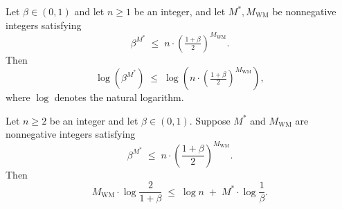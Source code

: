 \begin{theorem}
\label{wm_combined_potential_bound}
\leanok
{}
Let $\beta \in (0,1)$ and let $n \ge 1$ be an integer, and let $M^\ast, M_{\mathrm{WM}}$
be nonnegative integers satisfying
\[
  \beta^{M^\ast} \;\le\; n \cdot \left(\tfrac{1+\beta}{2}\right)^{M_{\mathrm{WM}}}.
\]
Then
\[
  \log\!\left(\beta^{M^\ast}\right)
  \;\le\;
  \log\!\left(n \cdot \left(\tfrac{1+\beta}{2}\right)^{M_{\mathrm{WM}}}\right),
\]
where $\log$ denotes the natural logarithm.
\end{theorem}

\begin{theorem}
\label{wm_mistake_bound_log}
\leanok
{}
Let $n \ge 2$ be an integer and let $\beta \in (0,1)$. Suppose $M^*$ and
$M_{\mathrm{WM}}$ are nonnegative integers satisfying
\[
  \beta^{M^*} \;\le\; n \cdot \left(\frac{1+\beta}{2}\right)^{M_{\mathrm{WM}}}.
\]
Then
\[
  M_{\mathrm{WM}} \cdot \log\!\frac{2}{1+\beta}
  \;\le\;
  \log n \;+\; M^* \cdot \log\frac{1}{\beta}.
\]
\end{theorem}

